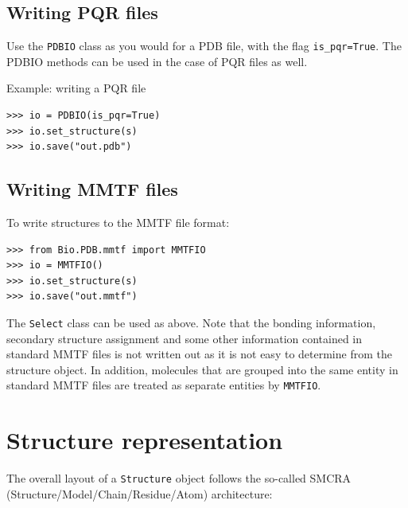 \subsection{Writing PQR files}

Use the \texttt{PDBIO} class as you would for a PDB file, with the flag \texttt{is\_pqr=True}. 
The PDBIO methods can be used in the case of PQR files as well.

Example: writing a PQR file

\begin{verbatim}
>>> io = PDBIO(is_pqr=True)
>>> io.set_structure(s)
>>> io.save("out.pdb")
\end{verbatim}

\subsection{Writing MMTF files}

To write structures to the MMTF file format:

\begin{verbatim}
>>> from Bio.PDB.mmtf import MMTFIO
>>> io = MMTFIO()
>>> io.set_structure(s)
>>> io.save("out.mmtf")
\end{verbatim}

The \texttt{Select} class can be used as above. Note that the bonding
information, secondary structure assignment and some other information contained
in standard MMTF files is not written out as it is not easy to determine from
the structure object. In addition, molecules that are grouped into the same
entity in standard MMTF files are treated as separate entities by
\texttt{MMTFIO}.


\section{Structure representation}

The overall layout of a \texttt{Structure} object follows the so-called SMCRA
(Structure/Model/Chain/Residue/Atom) architecture:

